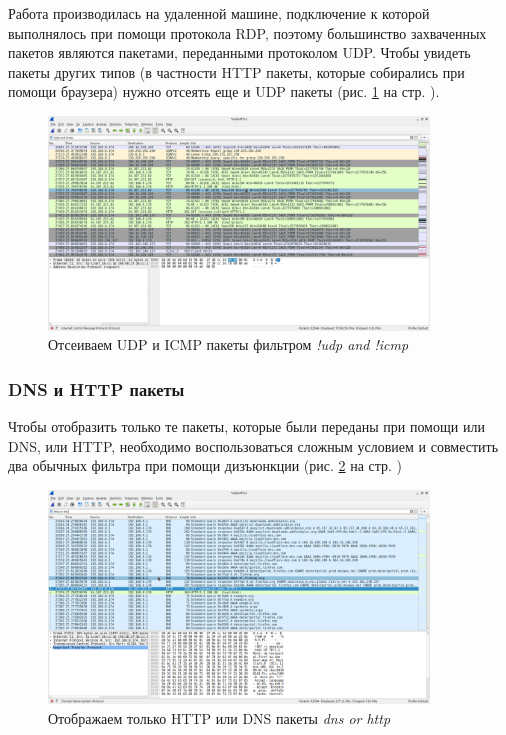 \documentclass[a4paper]{article}
\begin{document}
  Работа производилась на удаленной машине, подключение к которой выполнялось при помощи протокола RDP, поэтому 
  большинство захваченных пакетов являются пакетами, переданными протоколом UDP.
  Чтобы увидеть пакеты других типов (в частности HTTP пакеты, которые собирались 
  при помощи браузера) нужно отсеять еще и UDP пакеты (рис. \ref*{img:0006} на стр. \pageref{img:0006}).

  \begin{figure}[H]
    \centering
    \includegraphics[width=0.9\textwidth]{02_0006}
    \caption{Отсеиваем UDP и ICMP пакеты фильтром \textit{!udp and !icmp}}
    \label{img:0006}
  \end{figure}

  \subsubsection{DNS и HTTP пакеты}

  Чтобы отобразить только те пакеты, которые были переданы при помощи или DNS,
  или HTTP, необходимо воспользоваться сложным условием и совместить
  два обычных фильтра при помощи дизъюнкции (рис. \ref{img:0007} на стр. \pageref{img:0007}) 
  
  \begin{figure}[H]
    \centering
    \includegraphics[width=0.9\textwidth]{02_0007}
    \caption{Отображаем только HTTP или DNS пакеты \textit{dns or http}}
    \label{img:0007}
  \end{figure}
\end{document}
